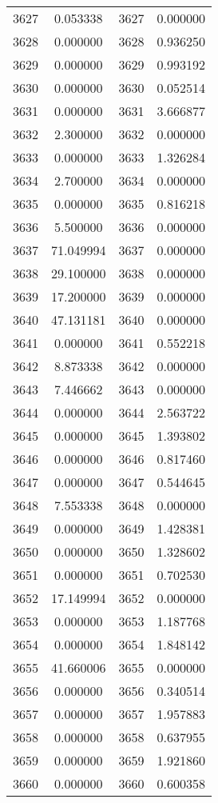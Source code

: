 \documentclass[12pt]{article}
\begin{document}
\begin{longtable}{@{}cccc@{}}
3627 & 0.053338 & 3627 & 0.000000 \\
3628 & 0.000000 & 3628 & 0.936250 \\
3629 & 0.000000 & 3629 & 0.993192 \\
3630 & 0.000000 & 3630 & 0.052514 \\
3631 & 0.000000 & 3631 & 3.666877 \\
3632 & 2.300000 & 3632 & 0.000000 \\
3633 & 0.000000 & 3633 & 1.326284 \\
3634 & 2.700000 & 3634 & 0.000000 \\
3635 & 0.000000 & 3635 & 0.816218 \\
3636 & 5.500000 & 3636 & 0.000000 \\
3637 & 71.049994 & 3637 & 0.000000 \\
3638 & 29.100000 & 3638 & 0.000000 \\
3639 & 17.200000 & 3639 & 0.000000 \\
3640 & 47.131181 & 3640 & 0.000000 \\
3641 & 0.000000 & 3641 & 0.552218 \\
3642 & 8.873338 & 3642 & 0.000000 \\
3643 & 7.446662 & 3643 & 0.000000 \\
3644 & 0.000000 & 3644 & 2.563722 \\
3645 & 0.000000 & 3645 & 1.393802 \\
3646 & 0.000000 & 3646 & 0.817460 \\
3647 & 0.000000 & 3647 & 0.544645 \\
3648 & 7.553338 & 3648 & 0.000000 \\
3649 & 0.000000 & 3649 & 1.428381 \\
3650 & 0.000000 & 3650 & 1.328602 \\
3651 & 0.000000 & 3651 & 0.702530 \\
3652 & 17.149994 & 3652 & 0.000000 \\
3653 & 0.000000 & 3653 & 1.187768 \\
3654 & 0.000000 & 3654 & 1.848142 \\
3655 & 41.660006 & 3655 & 0.000000 \\
3656 & 0.000000 & 3656 & 0.340514 \\
3657 & 0.000000 & 3657 & 1.957883 \\
3658 & 0.000000 & 3658 & 0.637955 \\
3659 & 0.000000 & 3659 & 1.921860 \\
3660 & 0.000000 & 3660 & 0.600358 \\

\end{longtable}
\end{document}

